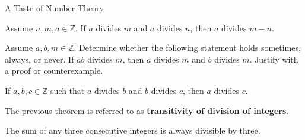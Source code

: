\begin{section}{A Taste of Number Theory}
\begin{theorem}
Assume $n,m,a\in\mathbb{Z}$. If $a$ divides $m$ and $a$ divides $n$, then $a$ divides $m-n$.
\end{theorem}

\begin{problem}
Assume $a,b,m\in\mathbb{Z}$. Determine whether the following statement holds sometimes, always, or never.  If $ab$ divides $m$, then $a$ divides $m$ and $b$ divides $m$.  Justify with a proof or counterexample.
\end{problem}

\begin{theorem}
If $a,b,c\in\mathbb{Z}$ such that $a$ divides $b$ and $b$ divides $c$, then $a$ divides $c$.
\end{theorem}

The previous theorem is referred to as \textbf{transitivity of division of integers}.

\begin{theorem}
The sum of any three consecutive integers is always divisible by three.
\end{theorem}

\end{section}
